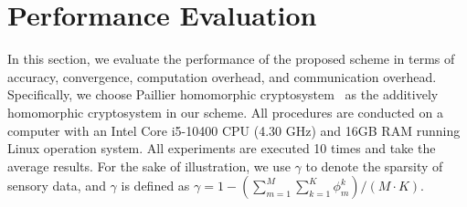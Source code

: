 \documentclass[conference]{IEEEtran}
\begin{document}
\section{Performance Evaluation}\label{sec7}
In this section, we evaluate the performance of the proposed scheme in terms of accuracy, convergence, computation overhead, and communication overhead.
Specifically, we choose Paillier homomorphic cryptosystem~\cite{paillier_public-key_1999} as the additively homomorphic cryptosystem in our scheme.
All procedures are conducted on a computer with an Intel Core i5-10400 CPU (4.30 GHz) and 16GB RAM running Linux operation system.
All experiments are executed 10 times and take the average results.
For the sake of illustration, we use $\gamma$ to denote the sparsity of sensory data, and $\gamma$ is defined as $\gamma = 1 - (\sum_{m=1}^M\sum_{k=1}^K\phi_m^k) / (M\cdot K)$.
\end{document}

